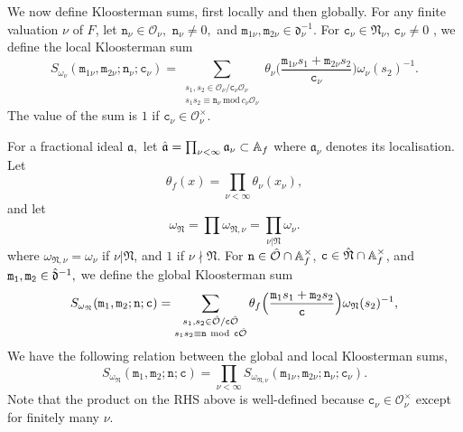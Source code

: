 \documentclass[reqno]{amsart}
\theoremstyle{plain}
\theoremstyle{definition}
\theoremstyle{remark}
\def\A{\mathbbm A}
\def\A{\mathbb A}
\begin{document}
We now define Kloosterman sums, first locally and then globally. For any finite valuation $\nu$ of $F$, let $\mathtt{n}_\nu\in \mathcal{O}_\nu,$ $\mathtt{n}_\nu\neq 0, $ and $\mathtt{m}_{1\nu},\mathtt{m}_{2\nu}\in\mathfrak{d}_\nu^{-1}$.  For $\mathtt{c}_\nu \in \mathfrak{N}_\nu$, $\mathtt{c}_\nu\neq 0$ , we define the local Kloosterman sum 
\begin{equation}\label{KS-local}
S_{\omega_\nu} (\mathtt{m}_{1\nu},\mathtt{m}_{2\nu};\mathtt{n}_\nu;\mathtt{c}_\nu) = \sum_{\substack{ s_{1},s_{2}\in \mathcal{O}_\nu / \mathtt{c}_\nu \mathcal{O}_\nu  \\{s_1s_2\equiv \mathtt{n}_\nu \ \mathrm{mod}\ c_\nu \mathcal{O}_\nu }} }\theta_\nu \Big(\frac{\mathtt{m}_{1\nu} s_{1}+\mathtt{m}_{2\nu} s_{2}}{\mathtt{c}_\nu}\Big)\omega_\nu(s_2)^{-1}. 
\end{equation}
The value of the sum is $1$ if $\mathtt{c}_\nu \in \mathcal{O}_\nu^\times$.

For a fractional ideal $\mathfrak{a},$ let $\Hat{\mathfrak{a}}=\prod_{\nu<\infty} \mathfrak{a}_\nu \subset \A_f$ where  $\mathfrak{a}_\nu$ denotes its localisation. Let 
$$
\theta_f(x)=\prod_{\nu < \infty} \theta_\nu (x_\nu),
$$ 
and let 
$$
\omega_{\mathfrak{N}}=\prod\omega_{\mathfrak{N},\nu}= \prod_{\nu|\mathfrak{N}} \omega_\nu.
$$
where $\omega_{\mathfrak{N},\nu}=\omega_\nu$ if $\nu| \mathfrak{N}$, and $1$
if $\nu \nmid \mathfrak{N}$. 
For $\mathtt{n}\in \Hat{\mathcal{O}}\cap \A^\times_{f}$, $\mathtt{c} \in \Hat{\mathfrak{N}} \cap \A^\times_{f}$, and $\mathtt{m_1},\mathtt{m_2}\in \Hat{\mathfrak{d}}^{-1},$  we define the global Kloosterman sum
 \begin{equation}\label{KS-global}
 S_{\omega_{\mathfrak{N}}} (\mathtt{m}_{1},\mathtt{m}_{2};\mathtt{n};\mathtt{c})= \sum_{\substack{ s_{1},s_{2}\in \Hat{\mathcal{O}} / \mathtt{c} \Hat{\mathcal{O}}  \\{s_1s_2\equiv \mathtt{n} \ \mathrm{mod}\ \mathtt{c}  \Hat{\mathcal{O}}}} } \theta_{f} \Big(\frac{\mathtt{m}_{1} s_{1}+\mathtt{m}_{2} s_{2}}{\mathtt{c}}\Big)\omega_{\mathfrak{N}}(s_2)^{-1},
 \end{equation}
We have the following relation between the global and local Kloosterman sums, 
$$ 
S_{\omega_{\mathfrak{N}}} (\mathtt{m}_{1},\mathtt{m}_{2};\mathtt{n};\mathtt{c})=\prod_{\nu <\infty} S_{\omega_{\mathfrak{N},\nu}} (\mathtt{m}_{1\nu},\mathtt{m}_{2\nu}; \mathtt{n}_\nu; \mathtt{c}_\nu).
$$
Note that the product on the RHS above is well-defined because $\mathtt{c}_\nu \in \mathcal{O}_\nu^\times$ except for finitely many $\nu$. 
\end{document}
